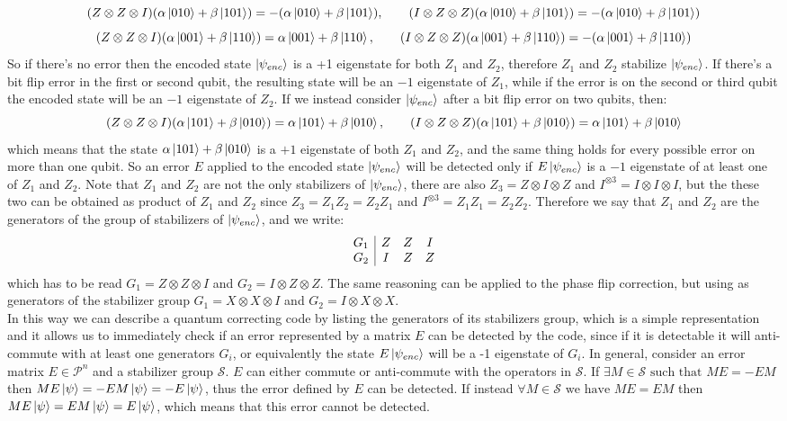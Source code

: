\documentclass{article}
\begin{document}
	\[(Z\otimes Z \otimes I)(\alpha\ket{010} + \beta\ket{101}) = -(\alpha\ket{010} + \beta\ket{101}),\qquad (I\otimes Z \otimes Z)(\alpha\ket{010} + \beta\ket{101}) = -(\alpha\ket{010} + \beta\ket{101})\]
	\[(Z\otimes Z \otimes I)(\alpha\ket{001} + \beta\ket{110}) = \alpha\ket{001} + \beta\ket{110},\qquad (I\otimes Z \otimes Z)(\alpha\ket{001} + \beta\ket{110}) = -(\alpha\ket{001} + \beta\ket{110})\]
	So if there's no error then the encoded state $\ket{\psi_{enc}}$ is a +1 eigenstate for both $Z_1$ and $Z_2$, therefore $Z_1$ and $Z_2$ stabilize $\ket{\psi_{enc}}$. If there's a bit flip error in the first or second qubit, the resulting state will be an $-1$ eigenstate of $Z_1$, while if the error is on the second or third qubit the encoded state will be an $-1$ eigenstate of $Z_2$. If we instead consider $\ket{\psi_{enc}}$ after a bit flip error on two qubits, then:
	\[(Z\otimes Z \otimes I)(\alpha\ket{101} + \beta\ket{010}) = \alpha\ket{101} + \beta\ket{010},\qquad (I\otimes Z \otimes Z)(\alpha\ket{101} + \beta\ket{010}) = \alpha\ket{101} + \beta\ket{010} \]
	which means that the state $\alpha\ket{101} + \beta\ket{010}$ is a $+1$ eigenstate of both $Z_1$ and $Z_2$, and the same thing holds for every possible error on more than one qubit. So an error $E$ applied to the encoded state $\ket{\psi_{enc}}$ will be detected only if $E\ket{\psi_{enc}}$ is a $-1$ eigenstate of at least one of $Z_1$ and $Z_2$. Note that $Z_1$ and $Z_2$ are not the only stabilizers of $\ket{\psi_{enc}}$, there are also $Z_3 = Z \otimes I \otimes Z$ and $I^{\otimes3} = I\otimes I \otimes I$, but the these two can be obtained as product of $Z_1$ and $Z_2$ since $Z_3 = Z_1Z_2 = Z_2Z_1$ and $I^{\otimes3} = Z_1Z_1 = Z_2Z_2$. Therefore we say that $Z_1$ and $Z_2$ are the generators of the group of stabilizers of $\ket{\psi_{enc}}$, and we write:
	\[
	\begin{array}{c|c c c}
		G_1 & Z & Z & I \\
		G_2 & I & Z & Z \\
	\end{array}
	\]
	which has to be read $G_1 = Z\otimes Z \otimes I$ and $G_2 = I\otimes Z \otimes Z$.
	The same reasoning can be applied to the phase flip correction, but using as generators of the stabilizer group $G_1 = X\otimes X \otimes I$ and $G_2 = I \otimes X \otimes X$.\\
	In this way we can describe a quantum correcting code by listing the generators of its stabilizers group, which is a simple representation and it allows us to immediately check if an error represented by a matrix $E$ can be detected by the code, since if it is detectable it will anti-commute with at least one generators $G_i$, or equivalently the state $E\ket{\psi_{enc}}$ will be a -1 eigenstate of $G_i$. In general, consider an error matrix $E \in \mathcal{P}^n$ and a stabilizer group $\mathcal{S}$. $E$ can either commute or anti-commute with the operators in $\mathcal{S}$. If $\exists M \in \mathcal{S} \text{ such that } ME = -EM$ then $ME\ket{\psi} = -EM\ket{\psi} = -E\ket{\psi}$, thus the error defined by $E$ can be detected. If instead $\forall M \in \mathcal{S} \text{ we have } ME = EM$ then $ME\ket{\psi} = EM\ket{\psi} = E\ket{\psi}$, which means that this error cannot be detected.\\
\end{document}
